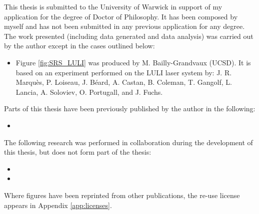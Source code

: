 
\begin{thesisdeclaration}
%

This thesis is submitted to the University of Warwick in support of my application for the degree of Doctor of Philosophy. It has been composed by myself and has not been submitted in any previous application for any degree. \\


\noindent The work presented (including data generated and data analysis) was carried out by the author except in the cases outlined below:
\begin{singlespacing}
\begin{itemize}
    \item Figure \ref{fig:SRS_LULI} was produced by M. Bailly-Grandvaux (UCSD). It is based on an experiment performed on the LULI laser system by: J. R. Marqu\`es, P. Loiseau, J. B\'eard, A. Castan, B. Coleman, T. Gangolf, L. Lancia, A. Soloviev, O. Portugall, and J. Fuchs.  
\end{itemize}{}
\end{singlespacing}

\noindent Parts of this thesis have been previously published by the author in the following:
\begin{singlespacing}
\begin{itemize}
    \item {}
\end{itemize}{}
\end{singlespacing}

\noindent The following research was performed in collaboration during the development of this thesis, but does not form part of the thesis:
\begin{singlespacing}
\begin{itemize}
\item {}
	\item {}
\end{itemize}
\end{singlespacing}

\noindent Where figures have been reprinted from other publications, the re-use license appears in Appendix \ref{app:licenses}.

\end{thesisdeclaration}
